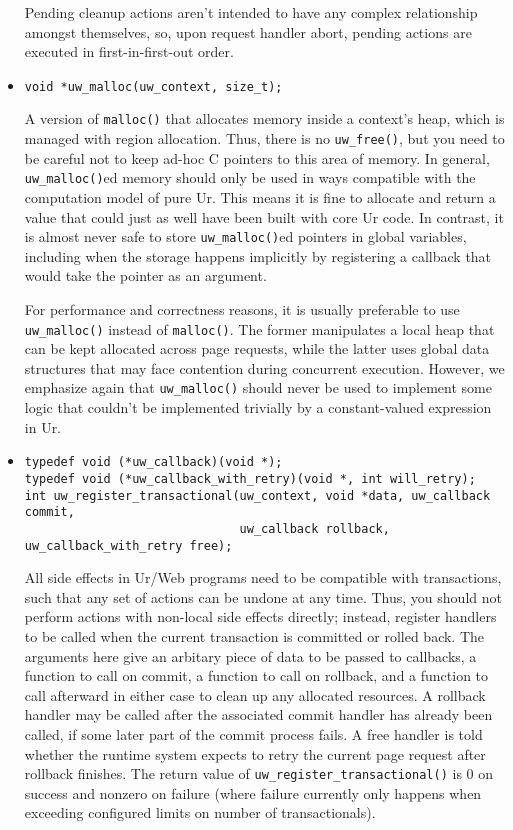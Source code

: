\documentclass{article}
\begin{document}
\begin{itemize}
  Pending cleanup actions aren't intended to have any complex relationship amongst themselves, so, upon request handler abort, pending actions are executed in first-in-first-out order.

  \item \begin{verbatim}
void *uw_malloc(uw_context, size_t);
  \end{verbatim}
  A version of \texttt{malloc()} that allocates memory inside a context's heap, which is managed with region allocation.  Thus, there is no \texttt{uw\_free()}, but you need to be careful not to keep ad-hoc C pointers to this area of memory.  In general, \texttt{uw\_malloc()}ed memory should only be used in ways compatible with the computation model of pure Ur.  This means it is fine to allocate and return a value that could just as well have been built with core Ur code.  In contrast, it is almost never safe to store \texttt{uw\_malloc()}ed pointers in global variables, including when the storage happens implicitly by registering a callback that would take the pointer as an argument.

  For performance and correctness reasons, it is usually preferable to use \texttt{uw\_malloc()} instead of \texttt{malloc()}.  The former manipulates a local heap that can be kept allocated across page requests, while the latter uses global data structures that may face contention during concurrent execution.  However, we emphasize again that \texttt{uw\_malloc()} should never be used to implement some logic that couldn't be implemented trivially by a constant-valued expression in Ur.

  \item \begin{verbatim}
typedef void (*uw_callback)(void *);
typedef void (*uw_callback_with_retry)(void *, int will_retry);
int uw_register_transactional(uw_context, void *data, uw_callback commit,
                              uw_callback rollback, uw_callback_with_retry free);
  \end{verbatim}
  All side effects in Ur/Web programs need to be compatible with transactions, such that any set of actions can be undone at any time.  Thus, you should not perform actions with non-local side effects directly; instead, register handlers to be called when the current transaction is committed or rolled back.  The arguments here give an arbitary piece of data to be passed to callbacks, a function to call on commit, a function to call on rollback, and a function to call afterward in either case to clean up any allocated resources.  A rollback handler may be called after the associated commit handler has already been called, if some later part of the commit process fails.  A free handler is told whether the runtime system expects to retry the current page request after rollback finishes.  The return value of \texttt{uw\_register\_transactional()} is 0 on success and nonzero on failure (where failure currently only happens when exceeding configured limits on number of transactionals).


\end{itemize}
\end{document}
